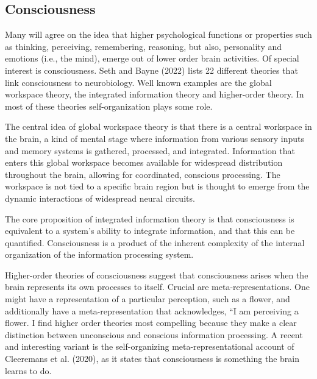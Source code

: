 \documentclass[
  a4paper,
  DIV=11,
  numbers=noendperiod,
  oneside]{scrreprt}
\begin{document}
\hypertarget{sec-Consciousness}{%
\subsection{Consciousness}\label{sec-Consciousness}}

Many will agree on the idea that higher psychological functions or
properties such as thinking, perceiving, remembering, reasoning, but
also, personality and emotions (i.e., the mind), emerge out of lower
order brain activities. Of special interest is consciousness. Seth and
Bayne (2022) lists 22 different theories that link consciousness to
neurobiology. Well known examples are the global workspace theory, the
integrated information theory and higher-order theory. In most of these
theories self-organization plays some role.

The central idea of global workspace theory is that there is a central
workspace in the brain, a kind of mental stage where information from
various sensory inputs and memory systems is gathered, processed, and
integrated. Information that enters this global workspace becomes
available for widespread distribution throughout the brain, allowing for
coordinated, conscious processing. The workspace is not tied to a
specific brain region but is thought to emerge from the dynamic
interactions of widespread neural circuits.

The core proposition of integrated information theory is that
consciousness is equivalent to a system's ability to integrate
information, and that this can be quantified. Consciousness is a product
of the inherent complexity of the internal organization of the
information processing system.

Higher-order theories of consciousness suggest that consciousness arises
when the brain represents its own processes to itself. Crucial are
meta-representations. One might have a representation of a particular
perception, such as a flower, and additionally have a
meta-representation that acknowledges, ``I am perceiving a flower. I
find higher order theories most compelling because they make a clear
distinction between unconscious and conscious information processing. A
recent and interesting variant is the self-organizing
meta-representational account of Cleeremans et al. (2020), as it states
that consciousness is something the brain learns to do.
\end{document}
